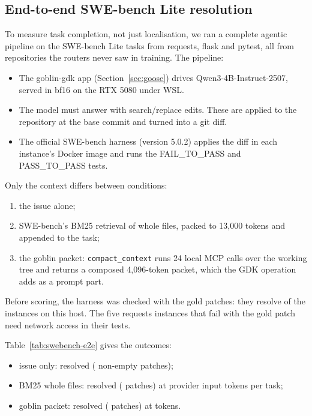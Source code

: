 \subsection{End-to-end SWE-bench Lite resolution}
To measure task completion, not just localisation, we ran a complete agentic pipeline on the \EtoeN{} SWE-bench Lite
tasks from requests, flask and pytest, all from repositories the routers never saw in training. The pipeline:
\begin{itemize}
\item The goblin-gdk app (Section~\ref{sec:goose}) drives Qwen3-4B-Instruct-2507, served in bf16 on the RTX 5080
under WSL.
\item The model must answer with search/replace edits. These are applied to the repository at the base commit and
turned into a git diff.
\item The official SWE-bench harness (version 5.0.2) applies the diff in each instance's Docker image and runs the
FAIL\_TO\_PASS and PASS\_TO\_PASS tests.
\end{itemize}

Only the context differs between conditions:
\begin{enumerate}
\item the issue alone;
\item SWE-bench's BM25 retrieval of whole files, packed to 13,000 tokens and appended to the task;
\item the goblin packet: \texttt{compact\_context} runs 24 local MCP calls over the working tree and returns a
composed 4,096-token packet, which the GDK operation adds as a prompt part.
\end{enumerate}

Before scoring, the harness was checked with the gold patches: they resolve \EtoeValid{} of the \EtoeN{} instances on
this host. The five requests instances that fail with the gold patch need network access in their tests.

Table~\ref{tab:swebench-e2e} gives the outcomes:
\begin{itemize}
\item issue only: \EtoeNoneResolved{} resolved (\EtoeNonePatches{} non-empty patches);
\item BM25 whole files: \EtoeBmResolved{} resolved (\EtoeBmPatches{} patches) at \EtoeBmInput{} provider input tokens per task;
\item goblin packet: \EtoeGoblinResolved{} resolved (\EtoeGoblinPatches{} patches) at \EtoeGoblinInput{} tokens.
\end{itemize}


